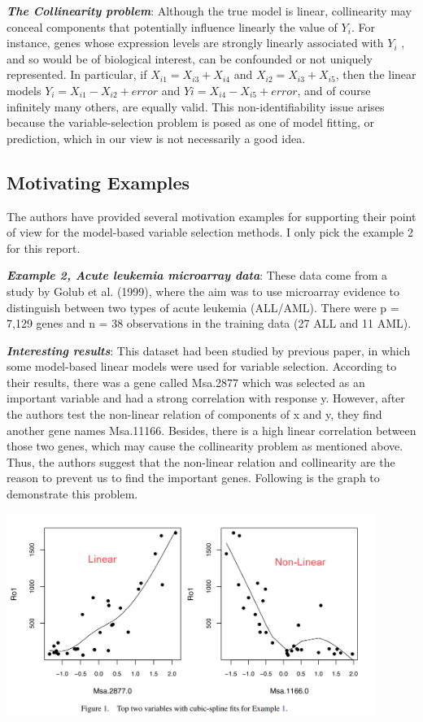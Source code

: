 \documentclass[paper=a4, fontsize=12pt]{scrartcl}
\numberwithin{equation}{section}
\numberwithin{figure}{section}
\numberwithin{table}{section}
\begin{document}
\textit{\textbf{The Collinearity problem}}: Although the true model is linear, collinearity may conceal components that potentially influence linearly the value of $Y_i$. For instance, genes whose expression levels are strongly linearly associated with $Y_i$ , and so would be of biological interest, can be confounded or not uniquely represented. In particular, if $X_{i1} = X_{i3} +X_{i4}$ and $X_{i2} = X_{i3} +X_{i5}$, then the linear models $Y_i = X_{i1} - X_{i2} +error$ and $Yi = X_{i4} - X_{i5} +error$, and of course infinitely many others, are equally valid. This non-identifiability issue arises because the variable-selection problem is posed as one of model fitting, or prediction, which in our view is not necessarily a good idea. 

\subsection{Motivating Examples}
The authors have provided several motivation examples for supporting their point of view for the model-based variable selection methods. I only pick the example 2 for this report.

\textit{\textbf{Example 2, Acute leukemia microarray data}}: These data come from a study by Golub et al. (1999), where the aim was to use microarray evidence to distinguish between two types of acute leukemia (ALL/AML). There were p = 7,129 genes and n = 38 observations in the training data (27 ALL and 11 AML). 

\textit{\textbf{Interesting results}}: This dataset had been studied by previous paper, in which some model-based linear models were used for variable selection. According to their results, there was a gene called Msa.2877 which was selected as an important variable and had a strong correlation with response y. However, after the authors test the non-linear relation of components of x and y, they find another gene names Msa.11166.  Besides, there is a high linear correlation between those two genes, which may cause the collinearity problem as mentioned above. Thus, the authors suggest that the non-linear relation and collinearity are the reason to prevent us to find the important genes. Following is the graph to demonstrate this problem. 

\begin{center}
\includegraphics[width=0.90000\textwidth]{../figure/overlooking.png}
\end{center}
\end{document}
